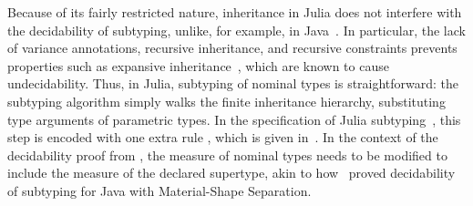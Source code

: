 Because of its fairly restricted nature, inheritance in Julia does not
interfere with the decidability of subtyping, unlike, for example,
in Java~\cite{bib:tate:taming-wildcards:2011}.
In particular, the lack of variance annotations, recursive inheritance,
and recursive constraints prevents properties such as expansive
inheritance~\cite{bib:kennedy:nom-sub-var-dec:2007}, which are known to cause
undecidability.
Thus, in Julia, subtyping of nominal types is straightforward: the subtyping
algorithm simply walks the finite inheritance hierarchy, substituting
type arguments of parametric types.
In the specification of Julia
subtyping~\cite{bib:zappa-nardelli:julia-sub:oopsla:2018},
this step is encoded with one extra rule ,
which is given in~.
In the context of the decidability proof from ,
the measure of nominal types needs to be modified to include the 
measure of the declared supertype, akin to
how~\citet{bib:greenman:f-bound-material-shape:2014}
proved decidability of subtyping for Java with Material-Shape Separation.

